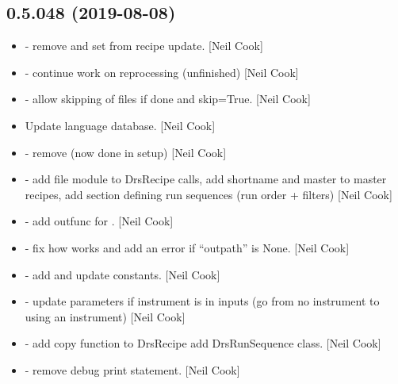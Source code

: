 \documentclass[a4paper,10pt,english]{report}
\begin{document}
\subsection{0.5.048 (2019-08-08)}
\label{\detokenize{misc/changelog:id94}}\begin{itemize}
\item {} 
 - remove  and set  from
recipe update. {[}Neil Cook{]}

\item {} 
 - continue work on reprocessing
(unfinished) {[}Neil Cook{]}

\item {} 
 - allow skipping of files if done and
\textendash{}skip=True. {[}Neil Cook{]}

\item {} 
Update language database. {[}Neil Cook{]}

\item {} 
 - remove  (now done in setup) {[}Neil
Cook{]}

\item {} 
 - add file module to
DrsRecipe calls, add shortname and master to master recipes, add
section defining run sequences (run order + filters) {[}Neil Cook{]}

\item {} 
 - add outfunc for . {[}Neil Cook{]}

\item {} 
 - fix how 
works and add an error if “outpath” is None. {[}Neil Cook{]}

\item {} 
 - add and update constants.
{[}Neil Cook{]}

\item {} 
 - update parameters if instrument is in inputs (go from
no instrument to using an instrument) {[}Neil Cook{]}

\item {} 
 - add copy function to DrsRecipe add DrsRunSequence
class. {[}Neil Cook{]}

\item {} 
 - remove debug print statement. {[}Neil Cook{]}

\end{itemize}
\end{document}
